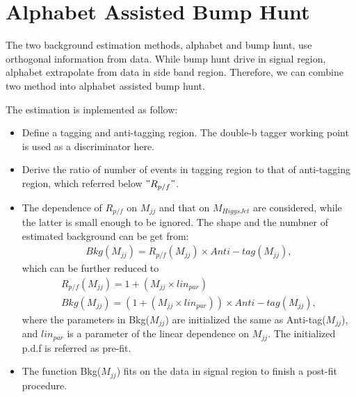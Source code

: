 \clearpage
\section{Alphabet Assisted Bump Hunt}
The two background estimation methods, alphabet and bump hunt, use orthogonal information from data.
While bump hunt drive in signal region, alphabet extrapolate from data in side band region. 
Therefore, we can combine two method into alphabet assisted bump hunt.

The estimation is inplemented as follow:
\begin{itemize}
\item Define a tagging and anti-tagging region. The double-b tagger working point is used as a discriminator here.
\item Derive the ratio of number of events in tagging region to that of anti-tagging region, which referred below $" R_{p/f} "$.
\item The dependence of $R_{p/f}$ on $M_{jj}$ and that on $M_{Higgs Jet}$ are considered, while the latter is small enough to be ignored. The shape and the numbner of estimated background can be get from:
\begin{equation} \label{eq3}
\begin{split}
Bkg(M_{jj})= R_{p/f}(M_{jj}) \times Anti-tag(M_{jj}), 
\end{split}
\end{equation}
which can be further reduced to 
\begin{equation} \label{eq4}
\begin{split}
R_{p/f}(M_{jj})= 1+(M_{jj} \times lin_{par}) \\
Bkg(M_{jj})= (1+(M_{jj} \times lin_{par})) \times Anti-tag(M_{jj}),
\end{split}
\end{equation}
where the parameters in Bkg($M_{jj}$) are initialized the same as Anti-tag($M_{jj}$), and $lin_{par}$ is a parameter of the linear dependence on $M_{jj}$. The initialized p.d.f is referred as pre-fit.
\item  The function Bkg($M_{jj}$) fits on the data in signal region to finish a post-fit procedure. 

\end{itemize}